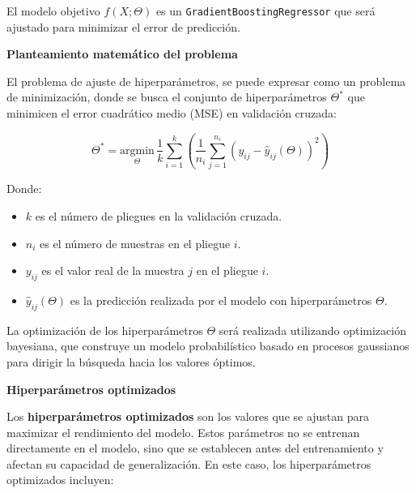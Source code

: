 \documentclass[
  12pt,
  letterpaper,
  DIV=11,
  numbers=noendperiod]{scrartcl}
\begin{document}
El modelo objetivo \(f(X; \Theta)\) es un
\texttt{GradientBoostingRegressor} que será ajustado para minimizar el
error de predicción.

\textbf{Planteamiento matemático del problema}

El problema de ajuste de hiperparámetros, se puede expresar como un
problema de minimización, donde se busca el conjunto de hiperparámetros
\(\Theta^*\) que minimicen el error cuadrático medio (MSE) en validación
cruzada:

\[
\Theta^* = \underset{\Theta}{\text{argmin}} \, \frac{1}{k} \sum_{i=1}^{k} \left( \frac{1}{n_i} \sum_{j=1}^{n_i} \left( y_{ij} - \hat{y}_{ij}(\Theta) \right)^2 \right)
\]

Donde:

\begin{itemize}
\item
  \(k\) es el número de pliegues en la validación cruzada.
\item
  \(n_i\) es el número de muestras en el pliegue \(i\).
\item
  \(y_{ij}\) es el valor real de la muestra \(j\) en el pliegue \(i\).
\item
  \(\hat{y}_{ij}(\Theta)\) es la predicción realizada por el modelo con
  hiperparámetros \(\Theta\).
\end{itemize}

La optimización de los hiperparámetros \(\Theta\) será realizada
utilizando optimización bayesiana, que construye un modelo
probabilístico basado en procesos gaussianos para dirigir la búsqueda
hacia los valores óptimos.

\textbf{Hiperparámetros optimizados}

Los \textbf{hiperparámetros optimizados} son los valores que se ajustan
para maximizar el rendimiento del modelo. Estos parámetros no se
entrenan directamente en el modelo, sino que se establecen antes del
entrenamiento y afectan su capacidad de generalización. En este caso,
los hiperparámetros optimizados incluyen:
\end{document}
